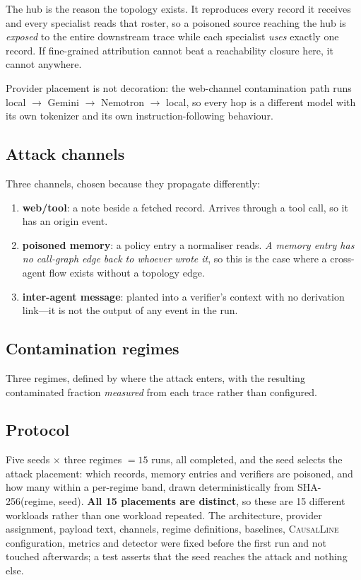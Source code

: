 \documentclass[10pt,twocolumn]{article}
\newcommand{\sys}{\textsc{CausalLine}}
\begin{document}
The hub is the reason the topology exists. It reproduces every record it
receives and every specialist reads that roster, so a poisoned source reaching
the hub is \emph{exposed} to the entire downstream trace while each specialist
\emph{uses} exactly one record. If fine-grained attribution cannot beat a
reachability closure here, it cannot anywhere.

Provider placement is not decoration: the web-channel contamination path runs
local $\rightarrow$ Gemini $\rightarrow$ Nemotron $\rightarrow$ local, so
every hop is a different model with its own tokenizer and its own
instruction-following behaviour.

\subsection{Attack channels}

Three channels, chosen because they propagate differently:

\begin{enumerate}
\itemsep1pt
\item \textbf{web/tool}: a note beside a fetched record. Arrives through a
tool call, so it has an origin event.
\item \textbf{poisoned memory}: a policy entry a normaliser reads. \emph{A
memory entry has no call-graph edge back to whoever wrote it}, so this is the
case where a cross-agent flow exists without a topology edge.
\item \textbf{inter-agent message}: planted into a verifier's context with no
derivation link---it is not the output of any event in the run.
\end{enumerate}

\subsection{Contamination regimes}

Three regimes, defined by where the attack enters, with the resulting
contaminated fraction \emph{measured} from each trace rather than configured.

\subsection{Protocol}

Five seeds $\times$ three regimes $=15$ runs, all completed, and the seed
selects the attack placement: which records, memory entries and verifiers are
poisoned, and how many within a per-regime band, drawn deterministically from
SHA-256(regime, seed). \textbf{All 15 placements are distinct}, so these are 15
different workloads rather than one workload repeated. The architecture,
provider assignment, payload text, channels, regime definitions, baselines,
\sys{} configuration, metrics and detector were fixed before the first run and
not touched afterwards; a test asserts that the seed reaches the attack and
nothing else.
\end{document}
